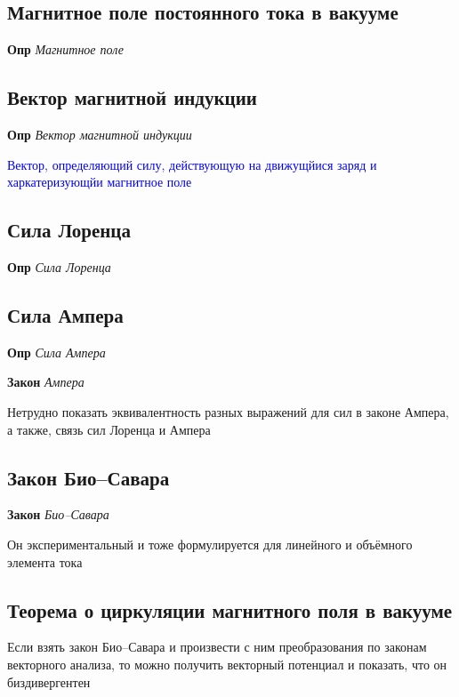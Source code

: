 \documentclass[a4paper, 14pt]{article}
\begin{document}
    \subsection{Магнитное поле постоянного тока в вакууме}
    
    \textbf{Опр} \textit{Магнитное поле}
    
    \subsection{Вектор магнитной индукции}
    
    \textbf{Опр} \textit{Вектор магнитной индукции}
    
    \textcolor{blue}{Вектор, определяющий силу, действующую на движущйися заряд и харкатеризующйи магнитное поле}
    
    \subsection{Сила Лоренца}
    
    \textbf{Опр} \textit{Сила Лоренца}
    
    \subsection{Сила Ампера}
    
    \textbf{Опр} \textit{Сила Ампера}
    
    \textbf{Закон} \textit{Ампера}
    
    Нетрудно показать эквивалентность разных выражений для сил в законе Ампера, а также, связь сил Лоренца и Ампера
    
    \subsection{Закон Био–Савара}
    
    \textbf{Закон} \textit{Био–Савара}
    
    Он экспериментальный и тоже формулируется для линейного и объёмного элемента тока
    
    \subsection{Теорема о циркуляции магнитного поля в вакууме}
    
    Если взять закон Био–Савара и произвести с ним преобразования по законам векторного анализа, то можно получить
    векторный потенциал и показать, что он биздивергентен
    
\end{document}
